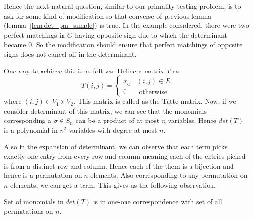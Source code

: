 Hence the next natural question, similar to our primality testing problem, is 
to ask for some kind of modification so that 
converse of previous lemma (lemma~\ref{lem:det_pm_simple}) is true. In the
example considered, there were two perfect matchings in $G$ having opposite 
sign due to which the determinant became $0$. So the modification should
ensure that perfect matchings of opposite signs does not cancel off in the
determinant.

One way to achieve this is as follows.  Define a matrix $T$ as
\[ T(i,j) = \begin{cases}
		x_{ij} & (i, j) \in E \\
		      0 & \text{ otherwise}
	\end{cases}
\]
where $(i,j) \in V_1 \times V_2$. This matrix is called as the Tutte matrix.
Now, if we consider determinant of this matrix, we can see that the monomials
corresponding a $\sigma \in S_n$ can be a product of at most $n$ variables.
Hence $det(T)$ is a polynomial in $n^2$ variables with degree at most $n$.

Also in the expansion of determinant, we can observe that each term picks
exactly one entry from every row and column meaning each of the entries 
picked is from a distinct row and column. Hence each of the them is a
bijection and hence is a permutation on $n$ elements. Also corresponding to any
permutation on $n$ elements, we can get a term. This gives us the following
observation.

\begin{observation}
	Set of monomials in $det(T)$ is in one-one correspondence with set of
	all permutations on $n$.
\end{observation}




